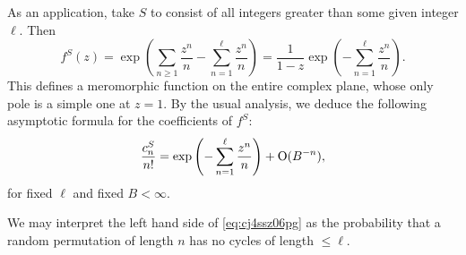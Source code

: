 \documentclass[reqno]{amsart} 
\begin{document}
As an application, take $S$ to consist of all integers greater than some given integer $\ell$.  Then
\begin{equation*}
  f^S(z) = \exp \left(  \sum_{n \geq 1} \frac{z^n}{ n } - \sum_{n = 1}^{\ell} \frac{z^n }{n}\right)
  =
  \frac{1}{1 - z} \exp \left( - \sum_{n = 1}^{\ell} \frac{z^n }{n} \right).
\end{equation*}
This defines a meromorphic function on the entire complex plane, whose only pole is a simple one at $z = 1$.  By the usual analysis, we deduce the following asymptotic formula for the coefficients of $f^S$:
\begin{equation}\label{eq:cj4ssz06pg}
  \frac{c_n^S}{n!} = \exp \left( - \sum_{n = 1 }^{\ell} \frac{z^n }{n} \right) + \operatorname{O}(B^{-n}),
\end{equation}
for fixed $\ell$ and fixed $B < \infty$.

We may interpret the left hand side of \eqref{eq:cj4ssz06pg} as the probability that a random permutation of length $n$ has no cycles of length $\leq \ell$.
\end{document}
